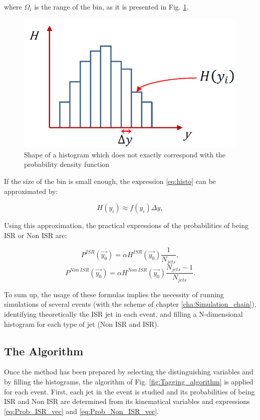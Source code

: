 \documentclass[12pt, oneside]{book}              %
\begin{document}
\noindent where $ \Omega_i $ is the range of the bin, as it is presented in Fig. \ref{fig:Histo_shape}.

\begin{figure}[h]
	\centering
	\includegraphics[width=0.5\linewidth]{./Imags_Doc/Histo_shape}
	\caption[Shape of a histogram]{Shape of a histogram which does not exactly correspond with the
		probability density function}
	\label{fig:Histo_shape}
\end{figure}

If the size of the bin is small enough, the expression \ref{eq:histo} can be approximated by:

\begin{equation} \label{eq:Approx_histo}
H(y_i) \approx f(y_i)\Delta y,
\end{equation}

Using this approximation, the practical expressions of the probabilities of being ISR or Non ISR are:

\begin{equation} \label{eq:Prob_ISR_hist}
P^{ISR}(\vec{y_0}) = \alpha H^{ISR}(\vec{y_0}) \frac{1}{N_{jets}},
\end{equation}
\begin{equation} \label{eq:Prob_Non_ISR_hist}
P^{Non\ ISR}(\vec{y_0}) = \alpha H^{Non\ ISR}(\vec{y_0}) \frac{N_{jets}-1}{N_{jets}}.
\end{equation}

To sum up, the usage of these formulas implies the necessity of running 
simulations of several events (with the scheme of chapter \ref{cha:Simulation_chain}),
identifying theoretically the ISR jet in each event, and filling a N-dimensional histogram
for each type of jet (Non ISR and ISR).

\subsection{The Algorithm} \label{sub:Algorithm}

Once the method has been prepared by selecting the distinguishing variables and 
by filling the histograms, the algorithm of Fig. \ref{fig:Tagging_algorithm} 
is applied for each event. First, each jet in the event is studied and its
probabilities of being ISR and Non ISR are determined from
its kinematical variables and expressions \ref{eq:Prob_ISR_vec} and \ref{eq:Prob_Non_ISR_vec}.
\end{document}
